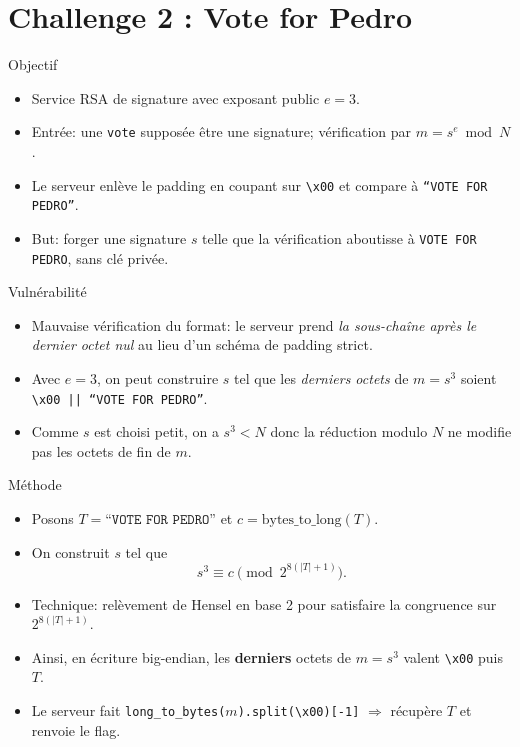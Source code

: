
\section{Challenge 2 : Vote for Pedro}

\begin{frame}{Objectif}
    \begin{itemize}
        \item Service RSA de signature avec exposant public $e=3$.
        \item Entrée: une \texttt{vote} supposée être une signature; vérification par $m = s^e \bmod N$.
        \item Le serveur enlève le padding en coupant sur \texttt{\textbackslash x00} et compare à \texttt{``VOTE FOR PEDRO''}.
        \item But: forger une signature $s$ telle que la vérification aboutisse à \texttt{VOTE FOR PEDRO}, sans clé privée.
    \end{itemize}
\end{frame}

\begin{frame}{Vulnérabilité}
    \begin{itemize}
        \item Mauvaise vérification du format: le serveur prend \emph{la sous-chaîne après le dernier octet nul} au lieu d'un schéma de padding strict.
        \item Avec $e=3$, on peut construire $s$ tel que les \emph{derniers octets} de $m=s^3$ soient \texttt{\textbackslash x00\,||\,``VOTE FOR PEDRO''}.
        \item Comme $s$ est choisi petit, on a $s^3 < N$ donc la réduction modulo $N$ ne modifie pas les octets de fin de $m$.
    \end{itemize}
\end{frame}

\begin{frame}{Méthode}
    \begin{itemize}
        \item Posons $T=\texttt{``VOTE FOR PEDRO''}$ et $c=\mathrm{bytes\_to\_long}(T)$.
        \item On construit $s$ tel que \[ s^3 \equiv c \pmod{2^{8(|T|+1)}}. \]
        \item Technique: relèvement de Hensel en base 2 pour satisfaire la congruence sur $2^{8(|T|+1)}$.
        \item Ainsi, en écriture big-endian, les \textbf{derniers} octets de $m=s^3$ valent \texttt{\textbackslash x00} puis $T$.
        \item Le serveur fait \texttt{long\_to\_bytes($m$).split(\textbackslash x00)[-1]} $\Rightarrow$ récupère $T$ et renvoie le flag.
    \end{itemize}
\end{frame}

